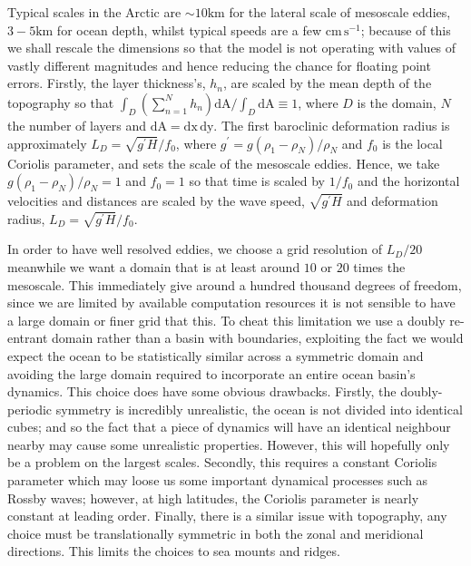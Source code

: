 \documentclass[12pt,a4paper]{report}
\begin{document}
  Typical scales in the Arctic are $\sim 10 \mathrm{km}$ for
  the lateral scale of mesoscale eddies,
  $3-5 \mathrm{km}$ for ocean depth, whilst typical speeds are a few
  $\mathrm{cm}\,\mathrm{s}^{-1}$; because of this we shall rescale the 
  dimensions so that the model is not operating with values of vastly different magnitudes
  and hence reducing the chance for floating point errors. Firstly, the layer thickness's,
  $h_{n}$, are scaled by the mean depth of the topography so that 
  $ \int_{D} \left(\sum_{n=1}^{N} h_{n}\right)  \mathrm{ d A} / \int_{D} \mathrm{ d A} \equiv 1 $, 
  where $D$  is the domain, $N$ the number of layers and
  $ \mathrm{ d A} = \mathrm{ d x}\, \mathrm{ d y}$. 
  The first baroclinic deformation radius is approximately $L_{D}=\sqrt{g^{\prime}H}/f_{0}$,
  where ${g^{\prime}=g\left(\rho_{1}-\rho_{N}\right)}/\rho_{N}$ and $f_{0}$ is 
  the local Coriolis parameter, and sets the scale of the mesoscale eddies.
  Hence, we take ${g\left(\rho_{1}-\rho_{N}\right)}/\rho_{N} = 1 $
  and $f_{0}=1$ so that time is scaled by $1/f_{0}$ and the horizontal velocities and distances are scaled by the wave speed, $\sqrt{g^{\prime}H}$ and deformation radius, $L_{D}=\sqrt{g^{\prime}H}/f_{0}$.

  In order to have well resolved eddies, we choose a grid resolution of $ L_{D} / 20$
  meanwhile we want a domain that is at least around $10$ or $20$ times the 
  mesoscale. This immediately give around a hundred thousand degrees of freedom,
  since we are limited by available computation resources it is not sensible
  to have a large domain or finer grid that this. To cheat this limitation
  we use a doubly re-entrant domain rather than a basin with boundaries, exploiting
  the fact we would expect the ocean to be statistically similar across a symmetric 
  domain and avoiding the large domain required to incorporate an entire ocean basin's
  dynamics. This choice does have some obvious drawbacks. Firstly, the doubly-periodic symmetry is
  incredibly unrealistic, the ocean is not divided into identical cubes; and so the 
  fact that a piece of dynamics will have an identical neighbour nearby may cause some
  unrealistic properties. However, this will hopefully only be a problem on the largest 
  scales. Secondly, this requires a constant Coriolis parameter which may loose
  us some important dynamical processes such as Rossby waves; however, at high latitudes, the Coriolis parameter is nearly constant
  at leading order.
  Finally, there is a similar issue with topography, any choice must be
  translationally symmetric in both the zonal and meridional directions. This limits the choices to sea mounts and ridges.  
  
\end{document}
